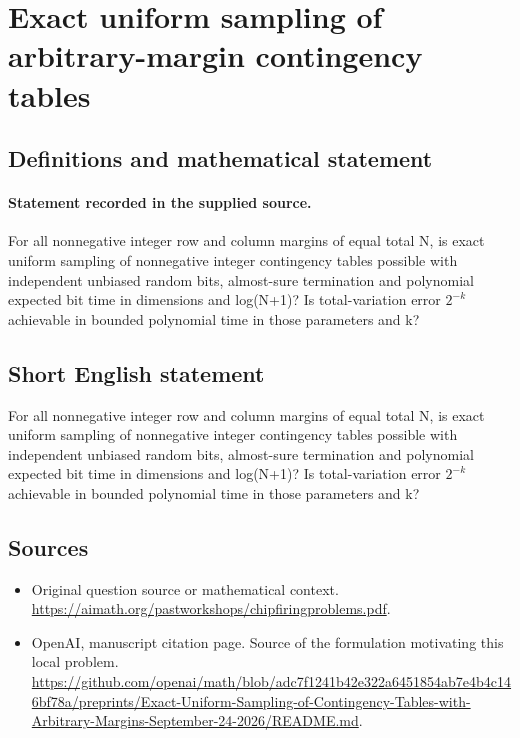 \documentclass[11pt]{article}
\begin{document}
\section*{Exact uniform sampling of arbitrary-margin contingency tables}\label{statement}
\subsection{Definitions and mathematical statement}
\paragraph{Statement recorded in the supplied source.}
For all nonnegative integer row and column margins of equal total N, is exact uniform sampling of nonnegative integer contingency tables possible with independent unbiased random bits, almost-sure termination and polynomial expected bit time in dimensions and log(N+1)? Is total-variation error $2^{-k}$ achievable in bounded polynomial time in those parameters and k?
\subsection{Short English statement}
For all nonnegative integer row and column margins of equal total N, is exact uniform sampling of nonnegative integer contingency tables possible with independent unbiased random bits, almost-sure termination and polynomial expected bit time in dimensions and log(N+1)? Is total-variation error $2^{-k}$ achievable in bounded polynomial time in those parameters and k?
\subsection{Sources}
\begin{itemize}
\item[S1] Original question source or mathematical context.
\url{https://aimath.org/pastworkshops/chipfiringproblems.pdf}.
\item[S2] OpenAI, manuscript citation page. Source of the formulation motivating this local problem.
\url{https://github.com/openai/math/blob/adc7f1241b42e322a6451854ab7e4b4c146bf78a/preprints/Exact-Uniform-Sampling-of-Contingency-Tables-with-Arbitrary-Margins-September-24-2026/README.md}.
\end{itemize}
\end{document}
